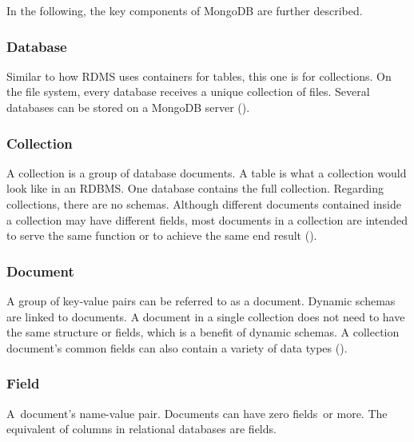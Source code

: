 In the following, the key components of MongoDB are further described.

\subsubsection{Database}
Similar to how RDMS uses containers for tables, this one is for collections. On the file system, every database receives a unique collection of files. Several databases can be stored on a MongoDB server (\cite{taylor_2020}).

\subsubsection{Collection}
A collection is a group of database documents. A table is what a collection would look like in an RDBMS. One database contains the full collection. Regarding collections, there are no schemas. Although different documents contained inside a collection may have different fields, most documents in a collection are intended to serve the same function or to achieve the same end result (\cite{intellipaat_2016}).

\subsubsection{Document}
A group of key-value pairs can be referred to as a document. Dynamic schemas are linked to documents. A document in a single collection does not need to have the same structure or fields, which is a benefit of dynamic schemas. A collection document's common fields can also contain a variety of data types (\cite{intellipaat_2016}).

\subsubsection{Field}
A document's name-value pair. Documents can have zero fields or more. The equivalent of columns in relational databases are fields. 

